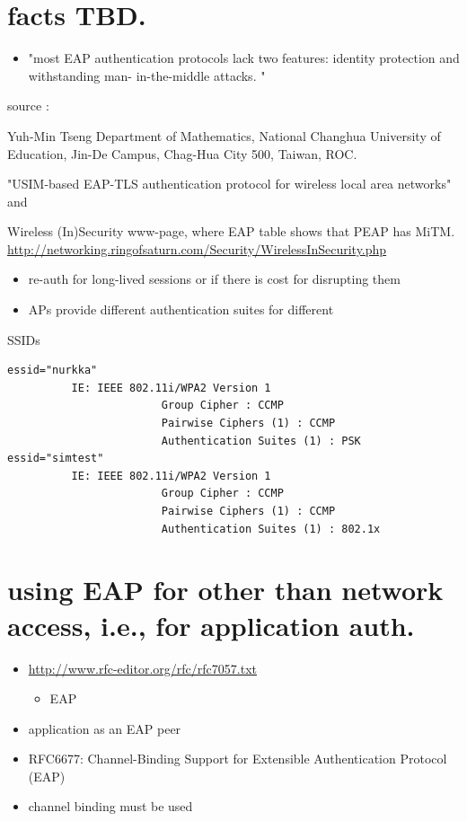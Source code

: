 \documentclass[12pt,a4paper,english]{tutthesis}
\begin{document}
\begin{otherlanguage}{english}
\section{facts TBD.}
\label{sec-7-1}
\begin{itemize}
\item "most EAP authentication protocols lack two features: identity
protection and withstanding man- in-the-middle attacks. "
\end{itemize}
source :

Yuh-Min Tseng Department of Mathematics, National Changhua University of Education,
Jin-De Campus, Chag-Hua City 500, Taiwan, ROC.

"USIM-based EAP-TLS authentication protocol for
wireless local area networks" 
and 

Wireless (In)Security www-page, where 
EAP table shows that PEAP has MiTM.
\url{http://networking.ringofsaturn.com/Security/WirelessInSecurity.php}

\begin{itemize}
\item re-auth for long-lived sessions or if there is cost for disrupting them
\item APs provide different authentication suites for different
\end{itemize}
SSIDs 
\begin{verbatim}
essid="nurkka"
          IE: IEEE 802.11i/WPA2 Version 1
                        Group Cipher : CCMP
                        Pairwise Ciphers (1) : CCMP
                        Authentication Suites (1) : PSK
essid="simtest"
          IE: IEEE 802.11i/WPA2 Version 1
                        Group Cipher : CCMP
                        Pairwise Ciphers (1) : CCMP
                        Authentication Suites (1) : 802.1x
\end{verbatim}
\section{using EAP for other than network access, i.e., for application auth.}
\label{sec-7-2}
\begin{itemize}
\item \url{http://www.rfc-editor.org/rfc/rfc7057.txt}
\begin{itemize}
\item EAP
\end{itemize}
\item application as an EAP peer
\item RFC6677: Channel-Binding Support for Extensible Authentication Protocol (EAP)
\item channel binding must be used
\end{itemize}


\end{otherlanguage}
\end{document}
